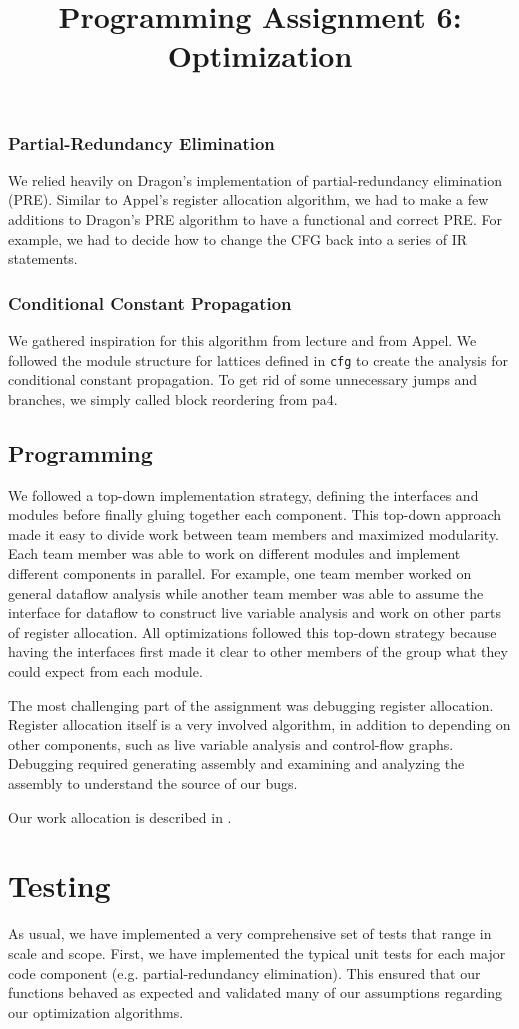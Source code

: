 \documentclass{hw} \title{Programming Assignment 6:\\ Optimization}
\begin{document}
\subsubsection{Partial-Redundancy Elimination} We relied heavily on Dragon's
implementation of partial-redundancy elimination (PRE). Similar to Appel's
register allocation algorithm, we had to make a few additions to Dragon's PRE
algorithm to have a functional and correct PRE. For example, we had to decide
how to change the CFG back into a series of IR statements.

\subsubsection{Conditional Constant Propagation} We gathered inspiration for
this algorithm from lecture and from Appel. We followed the module structure
for lattices defined in \texttt{cfg} to create the analysis for conditional
constant propagation. To get rid of some unnecessary jumps and branches, we
simply called block reordering from pa4.


\subsection{Programming} We followed a top-down implementation strategy,
defining the interfaces and modules before finally gluing together each
component. This top-down approach made it easy to divide work between team
members and maximized modularity. Each team member was able to work on
different modules and implement different components in parallel. For example,
one team member worked on general dataflow analysis while another team member
was able to assume the interface for dataflow to construct live variable
analysis and work on other parts of register allocation. All optimizations
followed this top-down strategy because having the interfaces first made it
clear to other members of the group what they could expect from each module.

The most challenging part of the assignment was debugging register allocation.
Register allocation itself is a very involved algorithm, in addition to
depending on other components, such as live variable analysis and control-flow
graphs. Debugging required generating assembly and examining and analyzing the
assembly to understand the source of our bugs.

Our work allocation is described in .

\section{Testing}\label{sec:testing} As usual, we have implemented a very
comprehensive set of tests that range in scale and scope. First, we have
implemented the typical unit tests for each major code component (e.g.
partial-redundancy elimination). This ensured that our functions behaved as
expected and validated many of our assumptions regarding our optimization
algorithms.
\end{document}
